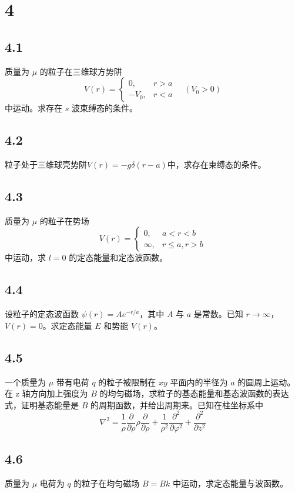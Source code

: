 \section{4}

\subsection{4.1}
质量为 $\mu$ 的粒子在三维球方势阱
$$ V(r) = 
\begin{cases} 
0, & r > a \\ 
-V_0, & r < a 
\end{cases} \quad (V_0 > 0) $$
中运动。求存在 $s$ 波束缚态的条件。

\subsection{4.2}
粒子处于三维球壳势阱$V(r) = -g \delta (r - a)$中，求存在束缚态的条件。

\subsection{4.3}
质量为 $\mu$ 的粒子在势场 $$ V(r) = 
\begin{cases} 
0, & a < r < b \\ 
\infty, & r \leq a, r > b 
\end{cases} $$ 中运动，求 $l = 0$ 的定态能量和定态波函数。

\subsection{4.4}
设粒子的定态波函数 $\psi(r) = Ae^{-r/a}$，其中 $A$ 与 $a$ 是常数。已知 $r \to \infty$，$V(r) = 0$。求定态能量 $E$ 和势能 $V(r)$。

\subsection{4.5}
一个质量为 $\mu$ 带有电荷 $q$ 的粒子被限制在 $xy$ 平面内的半径为 $a$ 的圆周上运动。在 z 轴方向加上强度为 $B$ 的均匀磁场，求粒子的基态能量和基态波函数的表达式，证明基态能量是 $B$ 的周期函数，并给出周期来。已知在柱坐标系中
$$ \nabla^2 = \frac{1}{\rho}\frac{\partial}{\partial \rho}\rho \frac{\partial}{\partial \rho} + \frac{1}{\rho^2}\frac{\partial^2}{\partial \varphi^2} + \frac{\partial^2}{\partial z^2} $$

\subsection{4.6}
质量为 $\mu$ 电荷为 $q$ 的粒子在均匀磁场 $B = Bk$ 中运动，求定态能量与波函数。

